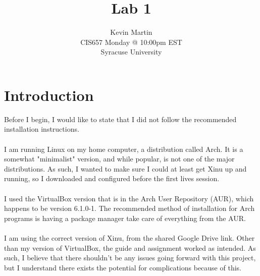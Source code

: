 \documentclass{article}
\author{Kevin Martin\\ CIS657 Monday @ 10:00pm EST\\ Syracuse University}
\title{Lab 1}
\begin{document}
\maketitle
\section{Introduction}
Before I begin, I would like to state that I did not follow the recommended installation instructions.\\\\
I am running Linux on my home computer, a distribution called Arch. It is a somewhat "minimalist" version, 
and while popular, is not one of the major distributions. As such, I wanted to make sure I could at least get Xinu up and running, 
so I downloaded and configured before the first lives session.\\\\
I used the VirtualBox version that is in the Arch User Repository (AUR), which happens to be version 6.1.0-1. The
recommended method of installation for Arch programs is having a package manager take care of everything from the AUR.\\\\
I am using the correct version of Xinu, from the shared Google Drive link. Other than my version of VirtualBox, the guide and
assignment worked as intended. As such, I believe that there shouldn't be any issues going forward with this project, but 
I understand there exists the potential for complications because of this.
\end{document}
